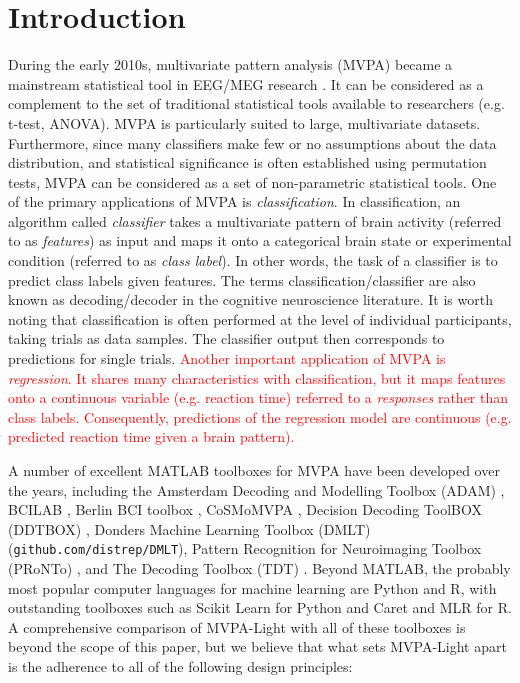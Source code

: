 \documentclass[utf8]{frontiersSCNS} %
\newcommand{\red}[1]{\textcolor{red}{#1}}
\begin{document}
\section{Introduction}

During the early 2010s, multivariate pattern analysis (MVPA) became a mainstream statistical tool in EEG/MEG research \citep{Blankertz2011,Lemm2011,Mur2009,Grootswagers2017DecodingData,Pereira2009,Varoquaux2017}. It can be considered as a complement to the set of traditional statistical tools available to researchers (e.g. t-test, ANOVA). MVPA is particularly suited to large, multivariate datasets. Furthermore, since many classifiers make few or no assumptions about the data distribution, and statistical significance is often established using permutation tests, MVPA can be considered as a set of non-parametric statistical tools.
One of the primary applications of MVPA is \textit{classification}. In classification, an algorithm called \textit{classifier} takes a multivariate pattern of brain activity (referred to as \textit{features}) as input and maps it onto a categorical brain state or experimental condition (referred to as \textit{class label}). In other words, the task of a classifier is to predict class labels given features. The terms classification/classifier are also known as decoding/decoder in the cognitive neuroscience literature. It is worth noting that classification is often performed at the level of individual participants, taking trials as data samples. The classifier output then corresponds to predictions for single trials. \red{Another important application of MVPA is \textit{regression}. It shares many characteristics with classification, but it maps features onto a continuous variable (e.g. reaction time) referred to a \textit{responses} rather than class labels. Consequently, predictions of the regression model are continuous  (e.g. predicted reaction time given a brain pattern).}

A number of excellent MATLAB toolboxes for MVPA have been developed over the years, including the Amsterdam Decoding and Modelling Toolbox (ADAM) \citep{Fahrenfort2018FromADAM}, BCILAB \citep{Kothe2013BCILAB:Development}, Berlin BCI toolbox \citep{Blankertz2016TheControl}, CoSMoMVPA \citep{Oosterhof2016CoSMoMVPA:Octave}, Decision Decoding ToolBOX (DDTBOX) \citep{Bode2019ThePotentials}, Donders Machine Learning Toolbox (DMLT) (\texttt{github.com/distrep/DMLT}), Pattern Recognition for Neuroimaging Toolbox (PRoNTo) \citep{Schrouff2013PRoNTo:Toolbox}, and The Decoding Toolbox (TDT) \citep{Hebart2015TheData}. Beyond MATLAB, the probably most popular computer languages for machine learning are Python and R, with outstanding toolboxes such as Scikit Learn \citep{Pedregosa2011Scikit-learn:Python} for Python and Caret \citep{Kuhn2008BuildingPackage} and MLR \citep{Bischl2000Mlr:R} for R. A comprehensive comparison of MVPA-Light with all of these toolboxes is beyond the scope of this paper, but we believe that what sets MVPA-Light apart is the adherence to all of the following design principles: 
\end{document}
